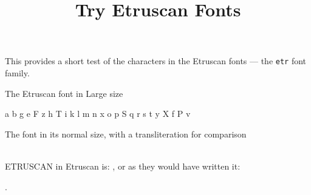 \documentclass{article}
\title{Try Etruscan Fonts}
\author{}
\date{}
\newcommand{\abc}{a b g e F z h T i k l m n x o p S q r s t y X f P v}
\newcommand{\Acomms}{%
\Aalpha
\Abeta
\Agamma
\Adelta
\Aepsilon
\Adigamma
\Azeta
\Aeta
\Atheta
\Aiota
\Akappa
\Alambda
\Amu
\Anu
\Axi
\Aomicron
\Api
\Aesade
\Aqoph
\Arho
\Asigma
\Atau
\Aupsilon
\Achi
\Aphi
\Apsi
\Avau
}
\newcommand{\ARcomms}{%
\ARalpha
\ARbeta
\ARgamma
\ARdelta
\ARepsilon
\ARdigamma
\ARzeta
\AReta
\ARtheta
\ARiota
\ARkappa
\ARlambda
\ARmu
\ARnu
\ARxi
\ARomicron
\ARpi
\AResade
\ARqoph
\ARrho
\ARsigma
\ARtau
\ARupsilon
\ARchi
\ARphi
\ARpsi
\ARvau
}
\begin{document}
\maketitle

    This provides a short test of the characters in the Etruscan fonts
--- the \verb|etr| font family.

\begin{center}
The Etruscan font in Large size \\
{\etrfamily\Large \abc\\ \ARcomms \par}
\end{center}

\begin{center}
The font in its normal size, with a transliteration for comparison \\
\textetr{\Acomms} \\
\translitetr{\Acomms}
\end{center}

    ETRUSCAN in Etruscan is: , or as they would have 
written it: \begin{flushright} 
.\textetr{\ARnu\ARalpha\ARgamma\ARsigma\ARupsilon\ARrho\ARtau\ARepsilon} 
\end{flushright}
\end{document}
